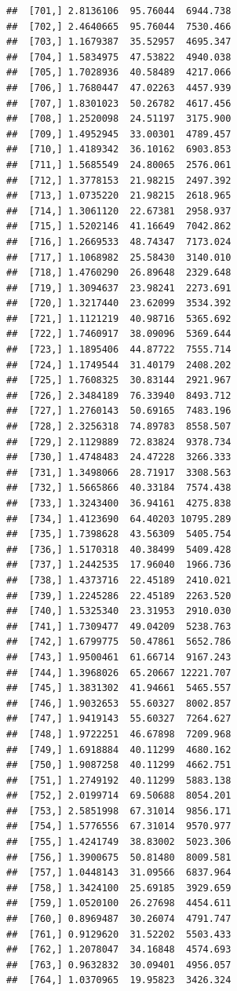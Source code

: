 \documentclass[article]{jss}\usepackage[]{graphicx}\usepackage[]{xcolor}
\makeatletter
\newenvironment{kframe}{%
 \def\at@end@of@kframe{}%
 \ifinner\ifhmode%
  \def\at@end@of@kframe{\end{minipage}}%
  \begin{minipage}{\columnwidth}%
 \fi\fi%
 \def\FrameCommand##1{\hskip\@totalleftmargin \hskip-\fboxsep
 \colorbox{shadecolor}{##1}\hskip-\fboxsep
     \hskip-\linewidth \hskip-\@totalleftmargin \hskip\columnwidth}%
 \MakeFramed {\advance\hsize-\width
   \@totalleftmargin\z@ \linewidth\hsize
   \@setminipage}}%
 {\par\unskip\endMakeFramed%
 \at@end@of@kframe}
\newenvironment{knitrout}{}{} %
\makeatother
\begin{document}
\begin{knitrout}
\begin{kframe}
\begin{verbatim}
##  [701,] 2.8136106  95.76044  6944.738
##  [702,] 2.4640665  95.76044  7530.466
##  [703,] 1.1679387  35.52957  4695.347
##  [704,] 1.5834975  47.53822  4940.038
##  [705,] 1.7028936  40.58489  4217.066
##  [706,] 1.7680447  47.02263  4457.939
##  [707,] 1.8301023  50.26782  4617.456
##  [708,] 1.2520098  24.51197  3175.900
##  [709,] 1.4952945  33.00301  4789.457
##  [710,] 1.4189342  36.10162  6903.853
##  [711,] 1.5685549  24.80065  2576.061
##  [712,] 1.3778153  21.98215  2497.392
##  [713,] 1.0735220  21.98215  2618.965
##  [714,] 1.3061120  22.67381  2958.937
##  [715,] 1.5202146  41.16649  7042.862
##  [716,] 1.2669533  48.74347  7173.024
##  [717,] 1.1068982  25.58430  3140.010
##  [718,] 1.4760290  26.89648  2329.648
##  [719,] 1.3094637  23.98241  2273.691
##  [720,] 1.3217440  23.62099  3534.392
##  [721,] 1.1121219  40.98716  5365.692
##  [722,] 1.7460917  38.09096  5369.644
##  [723,] 1.1895406  44.87722  7555.714
##  [724,] 1.1749544  31.40179  2408.202
##  [725,] 1.7608325  30.83144  2921.967
##  [726,] 2.3484189  76.33940  8493.712
##  [727,] 1.2760143  50.69165  7483.196
##  [728,] 2.3256318  74.89783  8558.507
##  [729,] 2.1129889  72.83824  9378.734
##  [730,] 1.4748483  24.47228  3266.333
##  [731,] 1.3498066  28.71917  3308.563
##  [732,] 1.5665866  40.33184  7574.438
##  [733,] 1.3243400  36.94161  4275.838
##  [734,] 1.4123690  64.40203 10795.289
##  [735,] 1.7398628  43.56309  5405.754
##  [736,] 1.5170318  40.38499  5409.428
##  [737,] 1.2442535  17.96040  1966.736
##  [738,] 1.4373716  22.45189  2410.021
##  [739,] 1.2245286  22.45189  2263.520
##  [740,] 1.5325340  23.31953  2910.030
##  [741,] 1.7309477  49.04209  5238.763
##  [742,] 1.6799775  50.47861  5652.786
##  [743,] 1.9500461  61.66714  9167.243
##  [744,] 1.3968026  65.20667 12221.707
##  [745,] 1.3831302  41.94661  5465.557
##  [746,] 1.9032653  55.60327  8002.857
##  [747,] 1.9419143  55.60327  7264.627
##  [748,] 1.9722251  46.67898  7209.968
##  [749,] 1.6918884  40.11299  4680.162
##  [750,] 1.9087258  40.11299  4662.751
##  [751,] 1.2749192  40.11299  5883.138
##  [752,] 2.0199714  69.50688  8054.201
##  [753,] 2.5851998  67.31014  9856.171
##  [754,] 1.5776556  67.31014  9570.977
##  [755,] 1.4241749  38.83002  5023.306
##  [756,] 1.3900675  50.81480  8009.581
##  [757,] 1.0448143  31.09566  6837.964
##  [758,] 1.3424100  25.69185  3929.659
##  [759,] 1.0520100  26.27698  4454.611
##  [760,] 0.8969487  30.26074  4791.747
##  [761,] 0.9129620  31.52202  5503.433
##  [762,] 1.2078047  34.16848  4574.693
##  [763,] 0.9632832  30.09401  4956.057
##  [764,] 1.0370965  19.95823  3426.324

\end{verbatim}
\end{kframe}
\end{knitrout}
\end{document}
